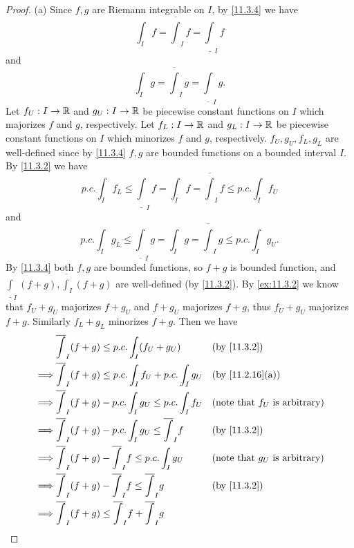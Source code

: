 \begin{proof}{(a)}
  Since \(f, g\) are Riemann integrable on \(I\), by \cref{11.3.4} we have
  \[
    \int_I f = \overline{\int}_I f = \underline{\int}_I f
  \]
  and
  \[
    \int_I g = \overline{\int}_I g = \underline{\int}_I g.
  \]
  Let \(f_U : I \to \mathbb{R}\) and \(g_U : I \to \mathbb{R}\) be piecewise constant functions on \(I\) which majorizes \(f\) and \(g\), respectively.
  Let \(f_L : I \to \mathbb{R}\) and \(g_L : I \to \mathbb{R}\) be piecewise constant functions on \(I\) which minorizes \(f\) and \(g\), respectively.
  \(f_U, g_U, f_L, g_L\) are well-defined since by \cref{11.3.4} \(f, g\) are bounded functions on a bounded interval \(I\).
  By \cref{11.3.2} we have
  \[
    p.c. \int_I f_L \leq \underline{\int}_I f = \int_I f = \overline{\int}_I f \leq p.c. \int_I f_U
  \]
  and
  \[
    p.c. \int_I g_L \leq \underline{\int}_I g = \int_I g = \overline{\int}_I g \leq p.c. \int_I g_U.
  \]
  By \cref{11.3.4} both \(f, g\) are bounded functions, so \(f + g\) is bounded function, and \(\underline{\int}_I (f + g), \overline{\int}_I (f + g)\) are well-defined (by \cref{11.3.2}).
  By \cref{ex:11.3.2} we know that \(f_U + g_U\) majorizes \(f + g_U\) and \(f + g_U\) majorizes \(f + g\), thus \(f_U + g_U\) majorizes \(f + g\).
  Similarly \(f_L + g_L\) minorizes \(f + g\).
  Then we have
  \begin{align*}
             & \overline{\int}_I (f + g) \leq p.c. \int_I (f_U + g_U)                   &   & \text{(by \cref{11.3.2})}               \\
    \implies & \overline{\int}_I (f + g) \leq p.c. \int_I f_U + p.c. \int_I g_U         &   & \text{(by \cref{11.2.16}(a))}           \\
    \implies & \overline{\int}_I (f + g) - p.c. \int_I g_U \leq p.c. \int_I f_U         &   & \text{(note that \(f_U\) is arbitrary)} \\
    \implies & \overline{\int}_I (f + g) - p.c. \int_I g_U \leq \overline{\int}_I f     &   & \text{(by \cref{11.3.2})}               \\
    \implies & \overline{\int}_I (f + g) - \overline{\int}_I f \leq p.c. \int_I g_U     &   & \text{(note that \(g_U\) is arbitrary)} \\
    \implies & \overline{\int}_I (f + g) - \overline{\int}_I f \leq \overline{\int}_I g &   & \text{(by \cref{11.3.2})}               \\
    \implies & \overline{\int}_I (f + g) \leq \overline{\int}_I f + \overline{\int}_I g &                                             \\

\end{align*}
\end{proof}
